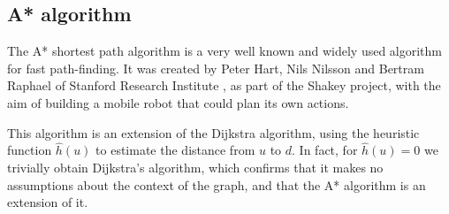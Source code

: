 \documentclass{report}[a4paper]
\theoremstyle{remark}
\begin{document}
\subsection{A* algorithm}
The A* shortest path algorithm is a very well known and widely used algorithm for fast path-finding. It was created by Peter Hart, Nils Nilsson and Bertram Raphael of Stanford Research Institute \cite{Astar}, as part of the Shakey project, with the aim of building a mobile robot that could plan its own actions.\par
This algorithm is an extension of the Dijkstra algorithm, using the heuristic function $\hat{h}(u)$ to estimate the distance from $u$ to $d$. In fact, for $\hat{h}(u) = 0$ we trivially obtain Dijkstra's algorithm, which confirms that it makes no assumptions about the context of the graph, and that the A* algorithm is an extension of it.
\end{document}
